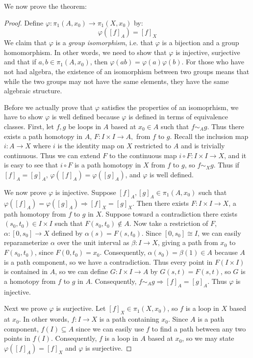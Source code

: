 We now prove the theorem: 
\begin{proof}
	Define $\varphi:\pi_1(A,x_0)\to \pi_1(X,x_0)$ by:
	\[\varphi([f]_A) = [f]_X\]
	We claim that $\varphi$ is a \emph{group isomorphism}, i.e. that $\varphi$ is a bijection and a group homomorphism. In other words, we need to show that $\varphi$ is injective, surjective and that if $a,b\in\pi_1(A,x_0)$, then $\varphi(ab) = \varphi(a)\varphi(b)$. For those who have not had algebra, the existence of an isomorphism between two groups means that while the two groups may not have the same elements, they have the same algebraic structure. 
	
	Before we actually prove that $\varphi$ satisfies the properties of an isomoprhism, we have to show $\varphi$ is well defined because $\varphi$ is defined in terms of equivalence classes. First, let $f,g$ be loops in $A$ based at $x_0\in A$ such that $f\sim_A g$. Thus there exists a path homotopy in $A$, $F:I\times I\to A,$ from $f$ to $g$. Recall the inclusion map $i:A\to X$ where $i$ is the identity map on $X$ restricted to $A$ and is trivially continuous. Thus we can extend $F$ to the continuous map $i\circ F:I\times I \to X$, and it is easy to see that $i\circ F$ is a path homotopy in $X$ from $f$ to $g$, so $f\sim_X g$. Thus if $[f]_A = [g]_A$, $\varphi([f]_A) = \varphi([g]_A)$, and $\varphi$ is well defined.
	
	We now prove $\varphi$ is injective. Suppose $[f]_A,[g]_A\in \pi_1(A,x_0)$ such that $\varphi([f]_A) = \varphi([g]_A) \Rightarrow [f]_X = [g]_X$. Then there exists $F:I\times I \to X$, a path homotopy from $f$ to $g$ in $X$. Suppose toward a contradiction there exists $(s_0,t_0)\in I\times I$ such that $F(s_0,t_0)\notin A$. Now take a restriction of $F$, $\alpha:[0,s_0] \to X$ defined by $\alpha(s) = F(s,t_0)$. Since $[0,s_0]\cong I$, we can easily reparameterize $\alpha$ over the unit interval as $\beta:I\to X$, giving a path from $x_0$ to $F(s_0,t_0)$, since $F(0,t_0)=x_0$. Consequently, $\alpha(s_0) = \beta(1)\in A$ because $A$ is a path component, so we have a contradiction. Thus every point in $F(I\times I)$ is contained in $A$, so we can define $G:I\times I\to A$ by $G(s,t)=F(s,t)$, so $G$ is a homotopy from $f$ to $g$ in $A$. Consequently, $f\sim_A g \Rightarrow [f]_A = [g]_A$. Thus $\varphi$ is injective.
	
	Next we prove $\varphi$ is surjective. Let $[f]_X\in \pi_1(X,x_0)$, so $f$ is a loop in $X$ based at $x_0$. In other words, $f:I\to X$ is a path containing $x_0$. Since $A$ is a path component, $f(I)\subseteq A$ since we can easily use $f$ to find a path between any two points in $f(I)$. Consequently, $f$ is a loop in $A$ based at $x_0$, so we may state $\varphi([f]_A) = [f]_X$ and $\varphi$ is surjective.
	

\end{proof}
